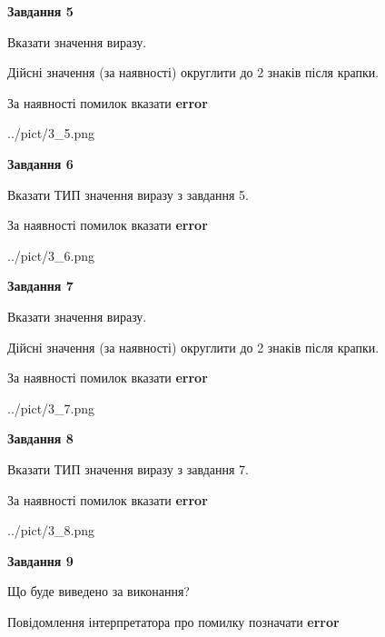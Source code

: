 \documentclass[11pt, ukrainian]{article}
\begin{document}
{\begin {large}
{\begin {center}\textbf{Завдання 5}\end {center}}\par
Вказати значення виразу. \par
Дійсні значення (за наявності) округлити до 2 знаків після крапки. \par
За наявності помилок вказати \textbf{error}

\begin{center}
	{../pict/3_5.png}
\end{center}
\newpage

{\begin {center}\textbf{Завдання 6}\end {center}}\par
Вказати ТИП значення виразу з завдання 5. \par
За наявності помилок вказати \textbf{error}

\begin{center}
	{../pict/3_6.png}
\end{center}
\newpage

{\begin {center}\textbf{Завдання 7}\end {center}}\par
Вказати значення виразу. \par
Дійсні значення (за наявності) округлити до 2 знаків після крапки. \par
За наявності помилок вказати \textbf{error}

\begin{center}
	{../pict/3_7.png}
\end{center}
\newpage

{\begin {center}\textbf{Завдання 8}\end {center}}\par
Вказати ТИП значення виразу з завдання 7. \par
За наявності помилок вказати \textbf{error}

\begin{center}
	{../pict/3_8.png}
\end{center}
\newpage

{\begin {center}\textbf{Завдання 9}\end {center}}\par
Що буде виведено за виконання? \par
Повідомлення інтерпретатора про помилку позначати \textbf{error}


\end{large}}
\end{document}
